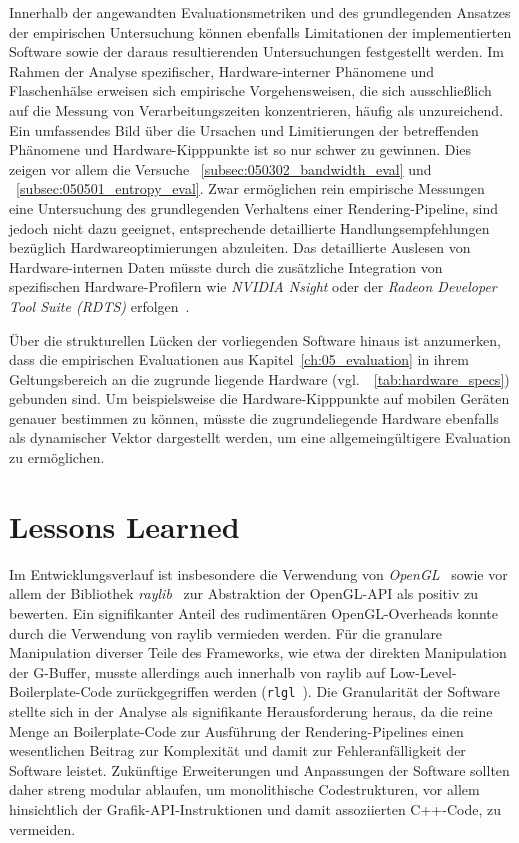 Innerhalb der angewandten Evaluationsmetriken und des grundlegenden Ansatzes der empirischen Untersuchung können
ebenfalls Limitationen der implementierten Software sowie der daraus resultierenden Untersuchungen
festgestellt werden.
Im Rahmen der Analyse spezifischer, Hardware-interner Phänomene und Flaschenhälse erweisen sich empirische
Vorgehensweisen, die sich ausschließlich auf die Messung von Verarbeitungszeiten konzentrieren, häufig als unzureichend.
Ein umfassendes Bild über die Ursachen und Limitierungen der betreffenden Phänomene und Hardware-Kipppunkte ist so nur
schwer zu gewinnen.
Dies zeigen vor allem die Versuche ~\ref{subsec:050302_bandwidth_eval} und ~\ref{subsec:050501_entropy_eval}.
Zwar ermöglichen rein empirische Messungen eine Untersuchung des grundlegenden Verhaltens einer Rendering-Pipeline,
sind jedoch nicht dazu geeignet, entsprechende detaillierte Handlungsempfehlungen bezüglich Hardwareoptimierungen
abzuleiten.
Das detaillierte Auslesen von Hardware-internen Daten müsste durch die zusätzliche Integration von spezifischen
Hardware-Profilern wie \textit{NVIDIA Nsight} oder der \textit{Radeon Developer Tool Suite (RDTS)}
erfolgen~\parencite[vgl.][Kap.~18.1]{akenine-mollerRealtimeRendering2019}.

Über die strukturellen Lücken der vorliegenden Software hinaus ist anzumerken, dass die empirischen Evaluationen aus
Kapitel~\ref{ch:05_evaluation} in ihrem Geltungsbereich an die zugrunde liegende Hardware
(vgl.\ ~\ref{tab:hardware_specs}) gebunden sind.
Um beispielsweise die Hardware-Kipppunkte auf mobilen Geräten genauer bestimmen zu können, müsste die zugrundeliegende
Hardware ebenfalls als dynamischer Vektor dargestellt werden, um eine allgemeingültigere Evaluation zu ermöglichen.


\section{Lessons Learned}
\label{sec:0604_lessons_learned}

Im Entwicklungsverlauf ist insbesondere die Verwendung von \textit{OpenGL}~\parencite[vgl.][]{KhronosOpenGLRegistry} sowie vor allem
der Bibliothek \textit{raylib}~\parencite[vgl.][]{Raylib, RaylibExamples} zur Abstraktion der OpenGL-\ac{API} als positiv zu
bewerten.
Ein signifikanter Anteil des rudimentären OpenGL-Overheads konnte durch die Verwendung von raylib vermieden werden.
Für die granulare Manipulation diverser Teile des Frameworks, wie etwa der direkten Manipulation der \ac{G-Buffer},
musste allerdings auch innerhalb von raylib auf Low-Level-Boilerplate-Code zurückgegriffen werden
(\texttt{rlgl}~\parencite[vgl.][]{raysan5RaylibSrcRlglh}).
Die Granularität der Software stellte sich in der Analyse als signifikante Herausforderung heraus, da die reine Menge an
Boilerplate-Code zur Ausführung der Rendering-Pipelines einen wesentlichen Beitrag zur Komplexität und damit zur
Fehleranfälligkeit der Software leistet.
Zukünftige Erweiterungen und Anpassungen der Software sollten daher streng modular ablaufen, um monolithische
Codestrukturen, vor allem hinsichtlich der Grafik-\ac{API}-Instruktionen und damit assoziierten C++-Code, zu vermeiden.

